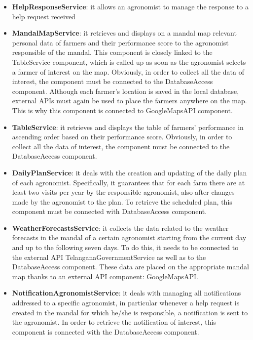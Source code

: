 \begin{itemize}
\begin{itemize}
    \item \textbf{HelpResponseService}: it allows an agronomist to manage the response to a help request received
    \item \textbf{MandalMapService}: it retrieves and displays on a mandal map relevant personal data of farmers and their performance score to the agronomist responsible of the mandal. This component is closely linked to the TableService component, which is called up as soon as the agronomist selects a farmer of interest on the map. Obviously, in order to collect all the data of interest, the component must be connected to the DatabaseAccess component. Although each farmer's location is saved in the local database, external APIs must again be used to place the farmers anywhere on the map. This is why this component is connected to GoogleMapsAPI component.
    \item \textbf{TableService}: it retrieves and displays the table of farmers’ performance in ascending order based on their performance score. Obviously, in order to collect all the data of interest, the component must be connected to the DatabaseAccess component.
    \item \textbf{DailyPlanService}: it deals with the creation and updating of the daily plan of each agronomist. Specifically, it guarantees that for each farm there are at least two visits per year by the responsible agronomist, also after changes made by the agronomist to the plan. To retrieve the scheduled plan, this component must be connected with DatabaseAccess component.
    \item \textbf{WeatherForecastsService}: it collects the data related to the weather forecasts in the mandal of a certain agronomist starting from the current day and up to the following seven days. To do this, it needs to be connected to the external API TelanganaGovernmentService as well as to the DatabaseAccess component. These data are placed on the appropriate mandal map thanks to an external API component: GoogleMapsAPI.
    \item \textbf{NotificationAgronomistService}: it deals with managing all notifications addressed to a specific agronomist, in particular whenever a help request is created in the mandal for which he/she is responsible, a notification is sent to the agronomist. In order to retrieve the notification of interest, this component is connected with the DatabaseAccess component.
\end{itemize}


\end{itemize}
